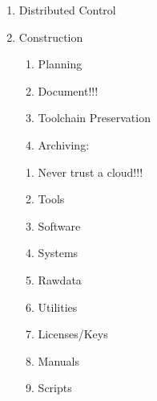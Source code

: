 \documentclass[letter,11pt,oneside]{article}
\begin{document}
\begin{enumerate}
\begin{enumerate}
   \item      Distributed Control
   \item   Construction
\vspace{-.15cm}
\begin{enumerate}\addtolength{\itemsep}{-0.5\baselineskip}
   \item      Planning
   \item      Document!!!
   \item      Toolchain Preservation
   \item      Archiving:
\end{enumerate}

\vspace{-.15cm}
\begin{enumerate}\addtolength{\itemsep}{-0.5\baselineskip}
   \item         Never trust a cloud!!!
   \item         Tools
   \item         Software
   \item         Systems
   \item         Rawdata
   \item         Utilities
   \item         Licenses/Keys
   \item         Manuals
   \item         Scripts
\end{enumerate}
\end{enumerate}
\end{enumerate}











\end{document}
